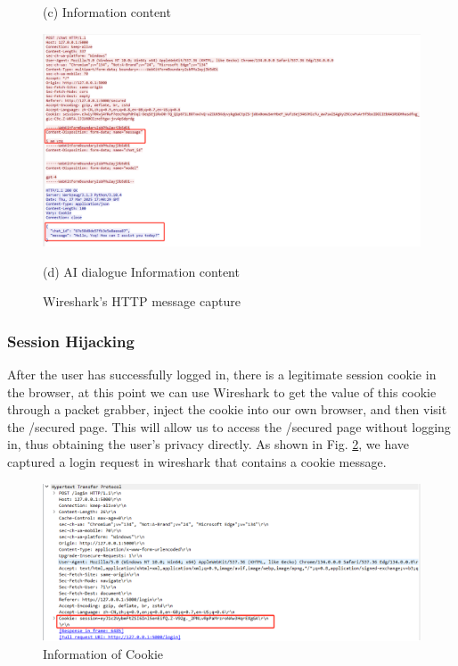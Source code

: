 \documentclass{article}
\begin{document}
\begin{figure}[H]
\begin{minipage}{0.5\textwidth}
        \caption*{(c) Information content}
    \end{minipage}
    \hfill
    \begin{minipage}{0.5\textwidth}
        \centering
        \includegraphics[width=\textwidth]{images/AI_dialogue_Information_content.png}
        \caption*{(d) AI dialogue Information content}
    \end{minipage}
    
    \caption{Wireshark's HTTP message capture}
    \label{fig:Demo Registration}
\end{figure}



\subsubsection{Session Hijacking}
After the user has successfully logged in, there is a legitimate session cookie in the browser, at this point we can use Wireshark to get the value of this cookie through a packet grabber, inject the cookie into our own browser, and then visit the /secured page. This will allow us to access the /secured page without logging in, thus obtaining the user's privacy directly. 
As shown in Fig. \ref{fig:cookie}, we have captured a login request in wireshark that contains a cookie message.

\begin{figure}[htb]
    \centering
    \includegraphics[width=1\textwidth]{images/Information_of_Cookie.png}
    \caption{Information of Cookie}
    \label{fig:cookie}
\end{figure}
\end{document}
